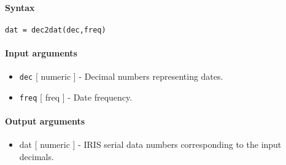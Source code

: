 


	\paragraph{Syntax}\label{syntax}

\begin{verbatim}
dat = dec2dat(dec,freq)
\end{verbatim}

\paragraph{Input arguments}\label{input-arguments}

\begin{itemize}
\item
  \texttt{dec} {[} numeric {]} - Decimal numbers representing dates.
\item
  \texttt{freq} {[} freq {]} - Date frequency.
\end{itemize}

\paragraph{Output arguments}\label{output-arguments}

\begin{itemize}
\itemsep1pt\parskip0pt
\item
  dat {[} numeric {]} - IRIS serial data numbers corresponding to the
  input decimals.
\end{itemize}


